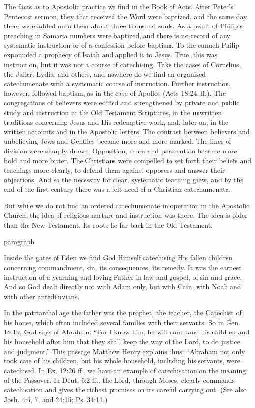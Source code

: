  The facts as to Apostolic practice we find in the Book of Acts. After Peter’s Pentecost sermon, they that received the Word were baptized, and the same day there were added unto them about three thousand souls. As a result of Philip’s preaching in Samaria numbers were baptized, and there is no record of any systematic instruction or of a confession before baptism. To the eunuch Philip expounded a prophecy of Isaiah and applied it to Jesus. True, this was instruction, but it was not a course of catechising. Take the cases of Cornelius, the Jailer, Lydia, and others, and nowhere do we find an organized catechumenate with a systematic course of instruction. Further instruction, however, followed baptism, as in the case of Apollos (Acts 18:24, ff.). The congregations of believers were edified and strengthened by private and public study and instruction in the Old Testament Scriptures, in the unwritten traditions concerning Jesus and His redemptive work, and, later on, in the written accounts and in the Apostolic letters. The contrast
between believers and unbelieving Jews and Gentiles became more and more marked. The lines of division were sharply drawn. Opposition, scorn and persecution became more bold and more bitter. The Christians were compelled to set forth their beliefs and teachings more clearly, to defend them against opposers and answer their objections. And so the necessity for clear, systematic teaching grew, and by the end of the first century there was a felt need of a Christian catechumenate.

But while we do not find an ordered catechumenate in operation in the Apostolic Church, the idea of religious nurture and instruction was there. The idea is older than the New Testament. Its roots lie far back in the Old Testament.

paragraph

Inside the gates of Eden we find God Himself catechising His fallen children concerning commandment, sin, its consequences, its remedy. It was the earnest instruction of a yearning and loving Father in law and gospel, of sin and grace. And so God dealt directly not with Adam only, but with Cain, with Noah and with other antediluvians.

In the patriarchal age the father was the prophet, the teacher, the Catechist of his house, which often included several families with their servants. So in Gen. 18:19, God says of Abraham: “For I know him, he will command his children and his household after him that they shall keep the way of the Lord,
to do justice and judgment.” This passage Matthew Henry explains thus: “Abraham not only took care of his children, but his whole household, including his servants, were catechised. In Ex. 12:26 ff., we have an example of catechisation on the meaning of the Passover. In Deut. 6:2 ff., the Lord, through Moses, clearly commands catechisation and gives the richest promises on its careful carrying out. (See also Josh. 4:6, 7, and 24:15; Ps. 34:11.)

